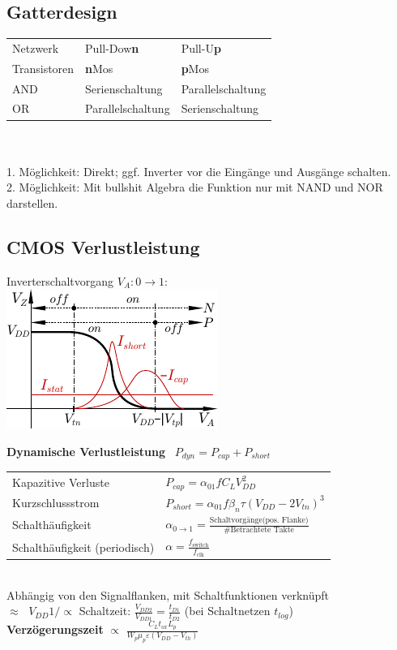 \documentclass[6pt,a4paper]{scrartcl}
\renewcommand{\emph}[1]{\textsf{\textbf{#1}}}
\newcommand{\ra}[0]{\ensuremath{\rightarrow}} 									%
\begin{document}
\begin{multicols*}{3}
	\subsection{Gatterdesign}
	\begin{tabular}{l|l|l}
		Netzwerk & Pull-Dow\bf{n} & Pull-U\bf{p} \\
		Transistoren & \textbf{n}Mos & \textbf{p}Mos \\ \hline
		AND & Serienschaltung	 & Parallelschaltung \\
		OR & Parallelschaltung & Serienschaltung \\
	\end{tabular}\\ \\
	1. Möglichkeit: Direkt; ggf. Inverter vor die Eingänge und Ausgänge schalten.\\
	2. Möglichkeit: Mit bullshit Algebra die Funktion nur mit NAND und NOR darstellen.
	
	\subsection{CMOS Verlustleistung}
	Inverterschaltvorgang $V_A: 0 \ra 1$:\\
	\includegraphics{./img/ds/char_inverter.pdf}
	
	\emph{Dynamische Verlustleistung} \qquad \ $P_{dyn} = P_{cap} + P_{short}$\\
	\begin{tabular}{ll}
		\quad Kapazitive Verluste \qquad \ \quad \ & $P_{cap} = \alpha_{01} f C_L V_{DD}^2$\\
		\quad Kurzschlussstrom	& $P_{short} = \alpha_{01} f \beta_n \tau (V_{DD} - 2V_{tn})^3$\\[0.8em]
		\quad Schalthäufigkeit & $\alpha_{0 \rightarrow 1} = \frac{\text{Schaltvorgänge(pos. Flanke)}}{\text{\# Betrachtete Takte}}$\\
		\quad Schalthäufigkeit (periodisch) & $\alpha = \frac{f_\text{switch}}{f_\text{clk}}$\\
	\end{tabular}\\
	Abhängig von den Signalflanken, mit Schaltfunktionen verknüpft\\ 
	$\approx \;$ $V_{DD} 1/\propto $ Schaltzeit: $\frac{V_{DD2}}{V_{DD1}} = \frac{t_{D1}}{t_{D2}}$ (bei Schaltnetzen $t_{log}$)\\
	\textbf{Verzögerungszeit} $\propto$ $\frac{C_Lt_{ox}L_p}{W_p\mu_p\varepsilon(V_{DD} - V_{th})}$
	

\end{multicols*}
\end{document}
